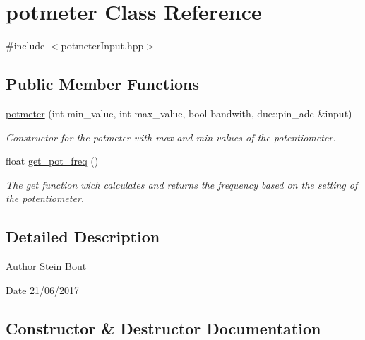 \hypertarget{classpotmeter}{}\section{potmeter Class Reference}
\label{classpotmeter}


{\ttfamily \#include $<$potmeter\+Input.\+hpp$>$}

\subsection*{Public Member Functions}
\begin{DoxyCompactItemize}
\item 
\hyperlink{classpotmeter_aeb2e784bddd5d068fa79f9cf33a61419}{potmeter} (int min\+\_\+value, int max\+\_\+value, bool bandwith, due\+::pin\+\_\+adc \&input)
\begin{DoxyCompactList}\small\item\em Constructor for the potmeter with max and min values of the potentiometer. \end{DoxyCompactList}\item 
float \hyperlink{classpotmeter_ad156c1b9cfbd8eb082c1c14af44d19b2}{get\+\_\+pot\+\_\+freq} ()
\begin{DoxyCompactList}\small\item\em The get function wich calculates and returns the frequency based on the setting of the potentiometer. \end{DoxyCompactList}\end{DoxyCompactItemize}


\subsection{Detailed Description}
\begin{DoxyAuthor}{Author}
Stein Bout 
\end{DoxyAuthor}
\begin{DoxyDate}{Date}
21/06/2017 
\end{DoxyDate}


\subsection{Constructor \& Destructor Documentation}
\mbox{\label{classpotmeter_aeb2e784bddd5d068fa79f9cf33a61419}} 
